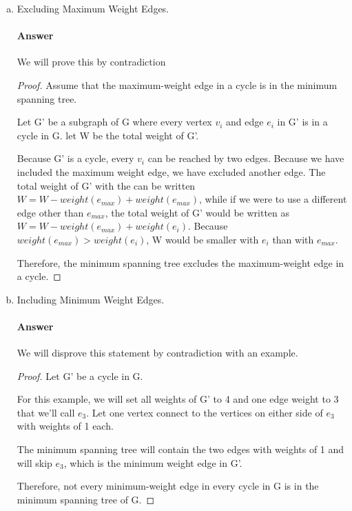 \documentclass{article}
\begin{document}
\begin{enumerate}[(a)]

    \item Excluding Maximum Weight Edges.

        \paragraph{Answer}

        We will prove this by contradiction

        \begin{proof}

            Assume that the maximum-weight edge in a cycle is in the minimum spanning
            tree.

            Let G' be a subgraph of G where every vertex $v_{i}$ and edge $e_{i}$ in G'
            is in a cycle in G. let W be the total weight of G'.

            Because G' is a cycle, every $v_{i}$ can be reached by two edges.
            Because we have included the maximum weight edge, we have excluded
            another edge. The total weight of G' with the can be written $W = W -
            weight(e_{max}) + weight(e_{max})$, while if we were to use a different
            edge other than $e_{max}$, the total weight of G' would be written as
            $W = W - weight(e_{max}) + weight(e_{i})$. Because $weight(e_{max}) > weight(e_{i})$, W would be smaller with $e_{i}$ than with $e_{max}$.

            Therefore, the minimum spanning tree excludes the maximum-weight
            edge in a cycle.

        \end{proof}


    \item Including Minimum Weight Edges.

        \paragraph{Answer}

        We will disprove this statement by contradiction with an example.

        \begin{proof}
            Let G' be a cycle in G.

            For this example, we will set all weights of G' to 4 and one edge
            weight to 3 that we'll call $e_{3}$. Let one vertex connect to the vertices on either side
            of $e_{3}$ with weights of 1 each.

            The minimum spanning tree will contain the two edges with weights of 1
            and will skip $e_{3}$, which is the minimum weight edge in G'.

            Therefore, not every minimum-weight edge in every cycle in G is in
            the minimum spanning tree of G.
        \end{proof}

\end{enumerate}
\end{document}
